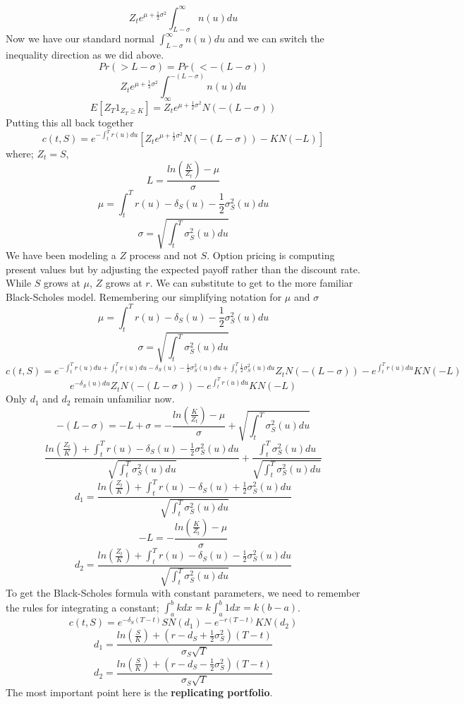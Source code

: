 \[Z_te^{\mu+\frac{1}{2}\sigma^2}\int_{L-\sigma}^{\infty}n(u)du\]
Now we have our standard normal $\int_{L-\sigma}^{\infty}n(u)du$ and we can
switch the inequality direction as we did above.
\[Pr(>L-\sigma)=Pr(<-(L-\sigma))\]
\[Z_te^{\mu+\frac{1}{2}\sigma^2}\int_{\infty}^{-(L-\sigma)}n(u)du\]
\[
    E\left[ Z_T1_{Z_T\geq K}\right] =
    Z_te^{\mu+\frac{1}{2}\sigma^2}N(-(L-\sigma))
\]
Putting this all back together
\begin{equation}
    c(t,S)=e^{-\int_t^Tr(u)du}
    \left[ Z_te^{\mu+\frac{1}{2}\sigma^2}N(-(L-\sigma)) -KN(-L) \right]
\end{equation}
where; $Z_t=S$,
\[L=\frac{ln\left(\frac{K}{Z_t}\right)-\mu}{\sigma}\]
\[\mu=\int_t^Tr(u)-\delta_S(u)-\frac{1}{2}\sigma_S^2(u)du\]
\[\sigma=\sqrt{\int_t^T\sigma_S^2(u)du}\]
We have been modeling a $Z$ process and not $S$. Option pricing is computing
present values but by adjusting the expected payoff rather than the discount
rate. While $S$ grows at $\mu$, $Z$ grows at $r$.
We can substitute to get to the more familiar Black-Scholes model.
Remembering our simplifying notation for $\mu$ and $\sigma$
\[\mu=\int_t^Tr(u)-\delta_S(u)-\frac{1}{2}\sigma_S^2(u)du\]
\[\sigma=\sqrt{\int_t^T\sigma_S^2(u)du}\]
\[
    c(t,S)=
    e^{-\int_t^Tr(u)du+\int_t^Tr(u)du-\delta_S(u)-\frac{1}{2}\sigma_S^2(u)du
    +\int_t^T\frac{1}{2}\sigma_S^2(u)du}
    Z_tN(-(L-\sigma))-e^{\int_t^Tr(u)du}KN(-L)
\]
\begin{equation} \label{BS}
    e^{-\delta_S(u)du}Z_tN(-(L-\sigma))-e^{\int_t^Tr(u)du}KN(-L)
\end{equation}
Only $d_1$ and $d_2$ remain unfamiliar now.
\[
    -(L-\sigma)=-L+\sigma=-\frac{ln\left(\frac{K}{Z_t}\right)-\mu}{\sigma}+
    \sqrt{\int_t^T\sigma_S^2(u)du}
\]
\[
    \frac{ln\left(\frac{Z_t}{K}\right)+\int_t^Tr(u)-\delta_S(u)-
    \frac{1}{2}\sigma_S^2(u)du}{\sqrt{\int_t^T\sigma_S^2(u)du}}+
    \frac{\int_t^T\sigma_S^2(u)du}{\sqrt{\int_t^T\sigma_S^2(u)du}}
\]
\begin{equation} \label{BSd1}
    d_1=\frac{ln\left(\frac{Z_t}{K}\right)+\int_t^Tr(u)-\delta_S(u)+
    \frac{1}{2}\sigma_S^2(u)du}{\sqrt{\int_t^T\sigma_S^2(u)du}}
\end{equation}
\[-L=-\frac{ln\left(\frac{K}{Z_t}\right)-\mu}{\sigma}\]
\begin{equation} \label{BSd2}
    d_2=\frac{ln\left(\frac{Z_t}{K}\right)+\int_t^Tr(u)-\delta_S(u)-
    \frac{1}{2}\sigma_S^2(u)du}{\sqrt{\int_t^T\sigma_S^2(u)du}}
\end{equation}
To get the Black-Scholes formula with constant parameters,
we need to remember the rules for integrating a constant;
$\int_a^bkdx=k\int_a^b1dx=k(b-a)$.
\[c(t,S)=e^{-\delta_S(T-t)}SN(d_1)-e^{-r(T-t)}KN(d_2)\]
\[
    d_1=\frac{ln\left(\frac{S}{K}\right) +
    (r-d_S+\frac{1}{2}\sigma_S^2)(T-t)}{\sigma_S\sqrt{T}}
\]
\[
    d_2=\frac{ln\left( \frac{S}{K} \right) +
    (r-d_S-\frac{1}{2}\sigma_S^2)(T-t)}{\sigma_S\sqrt{T}}
\]
The most important point here is the \textbf{replicating portfolio}.
